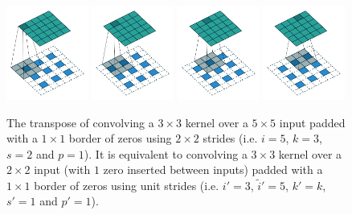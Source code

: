 \documentclass{report}
\begin{document}
\begin{figure}[p]
    \centering
    \includegraphics[width=0.24\textwidth]{pdf/padding_strides_transposed_00.pdf}
    \includegraphics[width=0.24\textwidth]{pdf/padding_strides_transposed_01.pdf}
    \includegraphics[width=0.24\textwidth]{pdf/padding_strides_transposed_02.pdf}
    \includegraphics[width=0.24\textwidth]{pdf/padding_strides_transposed_03.pdf}
    \caption{\label{fig:padding_strides_transposed} The transpose of convolving
        a $3 \times 3$ kernel over a $5 \times 5$ input padded with a $1 \times
        1$ border of zeros using $2 \times 2$ strides (i.e. $i = 5$, $k = 3$, $s
        = 2$ and $p = 1$). It is equivalent to convolving a $3 \times 3$ kernel
        over a $2 \times 2$ input (with $1$ zero inserted between inputs) padded
        with a $1 \times 1$ border of zeros using unit strides (i.e. $i' = 3$,
        $\tilde{i}' = 5$, $k' = k$, $s' = 1$ and $p' = 1$).}
\end{figure}
\end{document}
